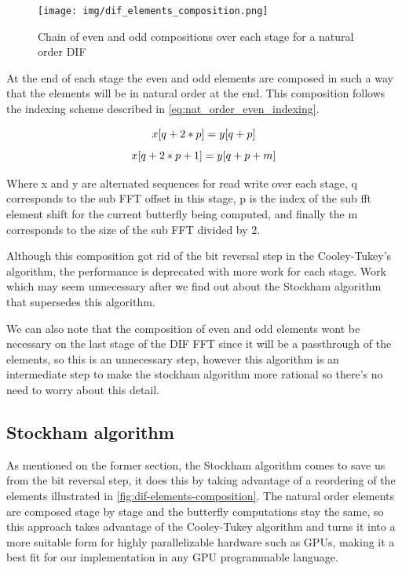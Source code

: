 \documentclass[
  oneside,
  11pt, a4paper,
  footinclude=true,
  headinclude=true,
  cleardoublepage=empty
]{scrbook}
\begin{document}
\begin{figure}[h] 
    \centering
    \texttt{[image: img/dif\_elements\_composition.png]}
    \caption{Chain of even and odd compositions over each stage for a natural order DIF}
    \label{fig:dif-elements-composition}
\end{figure}

At the end of each stage the even and odd elements are composed in such a way that the elements will be in natural order at the end. This composition follows the indexing scheme described in \autoref{eq:nat_order_even_indexing}.

\begin{equation} \label{eq:nat_order_even_indexing}
    x[q + 2*p] = y[q + p] \\
\end{equation}
\begin{equation} \label{eq:nat_order_odd_indexing}
    x[q + 2*p + 1] = y[q + p + m] \\
\end{equation}

Where x and y are alternated sequences for read write over each stage, q corresponds to the sub FFT offset in this stage, p is the index of the sub fft element shift for the current butterfly being computed, and finally the m corresponds to the size of the sub FFT divided by 2.

Although this composition got rid of the bit reversal step in the Cooley-Tukey's algorithm, the performance is deprecated with more work for each stage. Work which may seem unnecessary after we find out about the Stockham algorithm that supersedes this algorithm.

We can also note that the composition of even and odd elements wont be necessary on the last stage of the DIF FFT since it will be a passthrough of the elements, so this is an unnecessary step, however this algorithm is an intermediate step to make the stockham algorithm more rational so there's no need to worry about this detail.



\subsection{Stockham algorithm} \label{subsec:stockham-algorithm}

As mentioned on the former section, the Stockham algorithm comes to save us from the bit reversal step, it does this by taking advantage of a reordering of the elements \cite{govindaraju2008high} illustrated in \autoref{fig:dif-elements-composition}. The natural order elements are composed stage by stage and the butterfly computations stay the same, so this approach takes advantage of the Cooley-Tukey algorithm and turns it into a more suitable form for highly parallelizable hardware such as GPUs, making it a best fit for our implementation in any GPU programmable language. \newline
\end{document}
